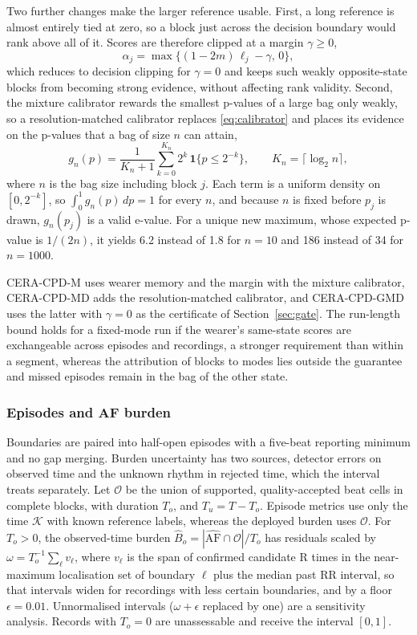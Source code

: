 \documentclass[preprint,12pt]{elsarticle}
\newcommand{\method}{CERA-CPD}
\newcommand{\1}{\mathbf{1}}
\begin{document}
Two further changes make the larger reference usable. First, a long reference is almost entirely tied at zero, so a block just across the decision boundary would rank above all of it. Scores are therefore clipped at a margin $\gamma\ge0$,
\begin{equation}
\alpha_j=\max\{(1-2m)\,\ell_j-\gamma,\,0\},
\label{eq:margin}
\end{equation}
which reduces to decision clipping for $\gamma=0$ and keeps such weakly opposite-state blocks from becoming strong evidence, without affecting rank validity. Second, the mixture calibrator rewards the smallest p-values of a large bag only weakly, so a resolution-matched calibrator replaces \eqref{eq:calibrator} and places its evidence on the p-values that a bag of size $n$ can attain,
\begin{equation}
g_n(p)=\frac{1}{K_n+1}\sum_{k=0}^{K_n}2^k\,\1\{p\le2^{-k}\},\qquad K_n=\lceil\log_2 n\rceil,
\label{eq:dyadic}
\end{equation}
where $n$ is the bag size including block $j$. Each term is a uniform density on $[0,2^{-k}]$, so $\int_0^1g_n(p)\,dp=1$ for every $n$, and because $n$ is fixed before $p_j$ is drawn, $g_n(p_j)$ is a valid e-value. For a unique new maximum, whose expected p-value is $1/(2n)$, it yields 6.2 instead of 1.8 for $n=10$ and 186 instead of 34 for $n=1000$.

\method{}-M uses wearer memory and the margin with the mixture calibrator, \method{}-MD adds the resolution-matched calibrator, and \method{}-GMD uses the latter with $\gamma=0$ as the certificate of Section~\ref{sec:gate}. The run-length bound holds for a fixed-mode run if the wearer's same-state scores are exchangeable across episodes and recordings, a stronger requirement than within a segment, whereas the attribution of blocks to modes lies outside the guarantee and missed episodes remain in the bag of the other state.

\subsubsection{Episodes and AF burden}
\label{sec:burdenmethod}
Boundaries are paired into half-open episodes with a five-beat reporting minimum and no gap merging. Burden uncertainty has two sources, detector errors on observed time and the unknown rhythm in rejected time, which the interval treats separately. Let $\mathcal O$ be the union of supported, quality-accepted beat cells in complete blocks, with duration $T_o$, and $T_u=T-T_o$. Episode metrics use only the time $\mathcal K$ with known reference labels, whereas the deployed burden uses $\mathcal O$. For $T_o>0$, the observed-time burden $\hat B_o=|\widehat{\mathrm{AF}}\cap\mathcal O|/T_o$ has residuals scaled by $\omega=T_o^{-1}\sum_\ell v_\ell$, where $v_\ell$ is the span of confirmed candidate R times in the near-maximum localisation set of boundary $\ell$ plus the median past RR interval, so that intervals widen for recordings with less certain boundaries, and by a floor $\epsilon=0.01$. Unnormalised intervals ($\omega+\epsilon$ replaced by one) are a sensitivity analysis. Records with $T_o=0$ are unassessable and receive the interval $[0,1]$.
\end{document}
